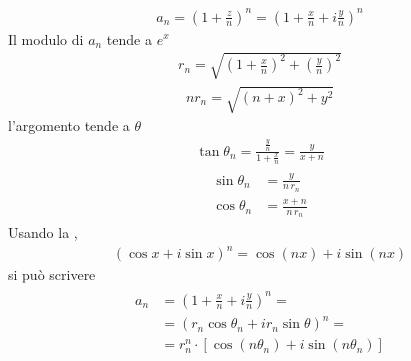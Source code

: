 \documentclass[letterpaper,10pt,italian]{jupyterBook}
\begin{document}
\sphinxAtStartPar
{}
\begin{equation*}
\begin{split}a_n = \left( 1 + \frac{z}{n} \right)^n = \left( 1 + \frac{x}{n} + i \frac{y}{n} \right)^n\end{split}
\end{equation*}
\sphinxAtStartPar
Il modulo di \(a_n\) tende a \(e^x\)
\begin{equation*}
\begin{split}r_n = \sqrt{\left(1+ \frac{x}{n}\right)^2 + \left(\frac{y}{n}\right)^2}\end{split}
\end{equation*}\begin{equation*}
\begin{split}n r_n = \sqrt{( n + x )^2 + y^2}\end{split}
\end{equation*}
\sphinxAtStartPar
l’argomento tende a \(\theta\)
\begin{equation*}
\begin{split}\tan \theta_n = \frac{\frac{y}{n}}{1 + \frac{x}{n}} = \frac{y}{x + n}\end{split}
\end{equation*}\begin{equation*}
\begin{split}\begin{aligned}
\sin \theta_n & = \frac{y}{n \, r_n} \\
\cos \theta_n & = \frac{x+n}{n \, r_n}
\end{aligned}\end{split}
\end{equation*}
\sphinxAtStartPar
Usando la {\hyperref[\detokenize{ch/algebra/complex-algebra-notes:math-hs-algebra-complex-notes-demoivre}]{}},
\begin{equation*}
\begin{split}( \cos x + i \sin x)^n = \cos( n x ) + i \sin ( n x )\end{split}
\end{equation*}
\sphinxAtStartPar
si può scrivere
\begin{equation*}
\begin{split}\begin{aligned}
  a_n & = \left( 1 + \frac{x}{n} + i \frac{y}{n} \right)^n = \\
      & = \left( r_n \cos \theta_n + i r_n \sin \theta \right)^n = \\
      & = r_n^n \cdot \left[ \cos ( n \theta_n ) + i \sin (n \theta_n) \right]
\end{aligned}\end{split}
\end{equation*}
\end{document}
